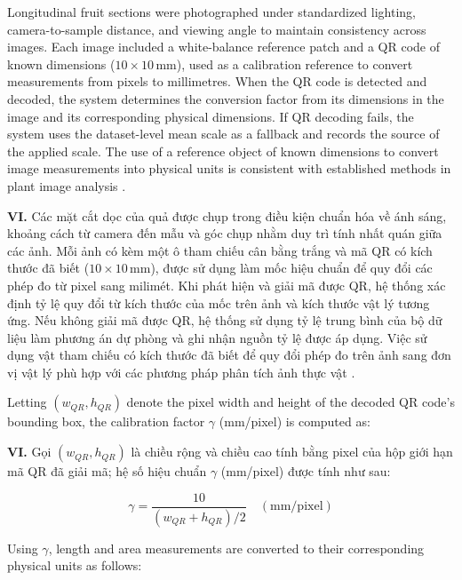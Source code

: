 \documentclass[final,1p,11pt,longtitle]{elsarticle}
\newenvironment{viet}{\par\smallskip\begingroup\color{viColor}\noindent\textbf{VI. }\ignorespaces}{\par\endgroup\smallskip}
\begin{document}
Longitudinal fruit sections were photographed under standardized lighting, camera-to-sample distance, and viewing angle to maintain consistency across images. Each image included a white-balance reference patch and a QR code of known dimensions ($10 \times 10$\,mm), used as a calibration reference to convert measurements from pixels to millimetres. When the QR code is detected and decoded, the system determines the conversion factor from its dimensions in the image and its corresponding physical dimensions. If QR decoding fails, the system uses the dataset-level mean scale as a fallback and records the source of the applied scale. The use of a reference object of known dimensions to convert image measurements into physical units is consistent with established methods in plant image analysis \cite{cass}.

\begin{viet}
Các mặt cắt dọc của quả được chụp trong điều kiện chuẩn hóa về ánh sáng, khoảng cách từ camera đến mẫu và góc chụp nhằm duy trì tính nhất quán giữa các ảnh. Mỗi ảnh có kèm một ô tham chiếu cân bằng trắng và mã QR có kích thước đã biết ($10 \times 10$\,mm), được sử dụng làm mốc hiệu chuẩn để quy đổi các phép đo từ pixel sang milimét. Khi phát hiện và giải mã được QR, hệ thống xác định tỷ lệ quy đổi từ kích thước của mốc trên ảnh và kích thước vật lý tương ứng. Nếu không giải mã được QR, hệ thống sử dụng tỷ lệ trung bình của bộ dữ liệu làm phương án dự phòng và ghi nhận nguồn tỷ lệ được áp dụng. Việc sử dụng vật tham chiếu có kích thước đã biết để quy đổi phép đo trên ảnh sang đơn vị vật lý phù hợp với các phương pháp phân tích ảnh thực vật \cite{cass}.
\end{viet}


Letting $(w_{QR}, h_{QR})$ denote the pixel width and height of the decoded QR code's bounding box, the calibration factor $\gamma$ (mm/pixel) is computed as:

\begin{viet}
Gọi $(w_{QR}, h_{QR})$ là chiều rộng và chiều cao tính bằng pixel của hộp giới hạn mã QR đã giải mã; hệ số hiệu chuẩn $\gamma$ (mm/pixel) được tính như sau:
\end{viet}

\begin{equation}
    \gamma = \frac{10}{(w_{QR} + h_{QR})/2} \quad (\text{mm/pixel})
\end{equation}

Using $\gamma$, length and area measurements are converted to their corresponding physical units as follows:
\end{document}
